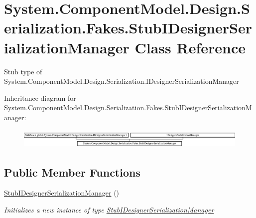 \hypertarget{class_system_1_1_component_model_1_1_design_1_1_serialization_1_1_fakes_1_1_stub_i_designer_serialization_manager}{\section{System.\-Component\-Model.\-Design.\-Serialization.\-Fakes.\-Stub\-I\-Designer\-Serialization\-Manager Class Reference}
\label{class_system_1_1_component_model_1_1_design_1_1_serialization_1_1_fakes_1_1_stub_i_designer_serialization_manager}
}


Stub type of System.\-Component\-Model.\-Design.\-Serialization.\-I\-Designer\-Serialization\-Manager 


Inheritance diagram for System.\-Component\-Model.\-Design.\-Serialization.\-Fakes.\-Stub\-I\-Designer\-Serialization\-Manager\-:\begin{figure}[H]
\begin{center}
\leavevmode
\includegraphics[height=0.980736cm]{class_system_1_1_component_model_1_1_design_1_1_serialization_1_1_fakes_1_1_stub_i_designer_serialization_manager}
\end{center}
\end{figure}
\subsection*{Public Member Functions}
\begin{DoxyCompactItemize}
\item 
\hyperlink{class_system_1_1_component_model_1_1_design_1_1_serialization_1_1_fakes_1_1_stub_i_designer_serialization_manager_aef4ffeb01870c180c9fead3e868a8fe1}{Stub\-I\-Designer\-Serialization\-Manager} ()
\begin{DoxyCompactList}\small\item\em Initializes a new instance of type \hyperlink{class_system_1_1_component_model_1_1_design_1_1_serialization_1_1_fakes_1_1_stub_i_designer_serialization_manager}{Stub\-I\-Designer\-Serialization\-Manager}\end{DoxyCompactList}\end{DoxyCompactItemize}
